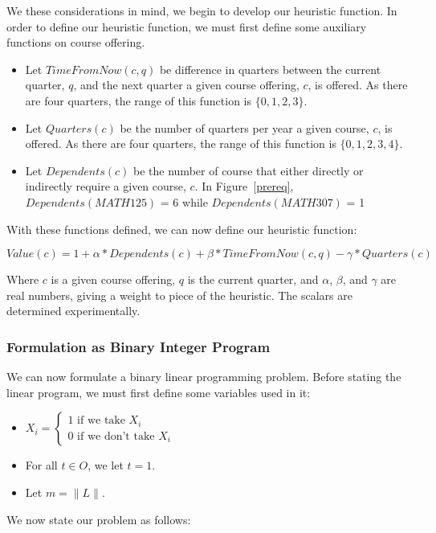 \documentclass[11pt]{article} %
\begin{document}
We these considerations in mind, we begin to develop our heuristic function. In
order to define our heuristic function, we must first define some auxiliary
functions on course offering.  \begin{itemize} \item Let $TimeFromNow(c, q)$ be
difference in quarters between the current quarter, $q$, and the next quarter
a given course offering, $c$, is offered. As there are four quarters, the range
of this function is $\{0, 1, 2, 3\}$.  \item Let $Quarters(c)$ be the number of
quarters per year a given course, $c$, is offered. As there are four quarters,
the range of this function is $\{0, 1, 2, 3, 4\}$.  \item Let $Dependents(c)$ be
the number of course that either directly or indirectly require a given course,
$c$. In Figure~\ref{prereq}, $Dependents(MATH125)$ = 6 while
$Dependents(MATH307)$ = 1 \end{itemize}

With these functions defined, we can now define our heuristic function:

\begin{equation} 
    Value(c) = 1 + \alpha * Dependents(c) + \beta * TimeFromNow(c,q) 
    - \gamma * Quarters(c)
    \label{value_func}
\end{equation} 

Where $c$ is a given course offering,
$q$ is the current quarter, and $\alpha$, $\beta$, and $\gamma$ are real
numbers, giving a weight to piece of the heuristic. The scalars are determined
experimentally.

\subsubsection{Formulation as Binary Integer Program} We can now formulate
a binary linear programming problem. Before stating the linear
program, we must first define some variables used in it: \\ \begin{itemize}
\item $ X_i = \left\{ \begin{array}{lr} 1 \text{ if we take } X_i\\ 0 \text{ if
we don't take } X_i \end{array} \right. $ \item For all $t \in O$, we let $t
= 1$.  \item Let $m = \|L\|$.  \end{itemize} We now state our problem as
follows:
\end{document}

